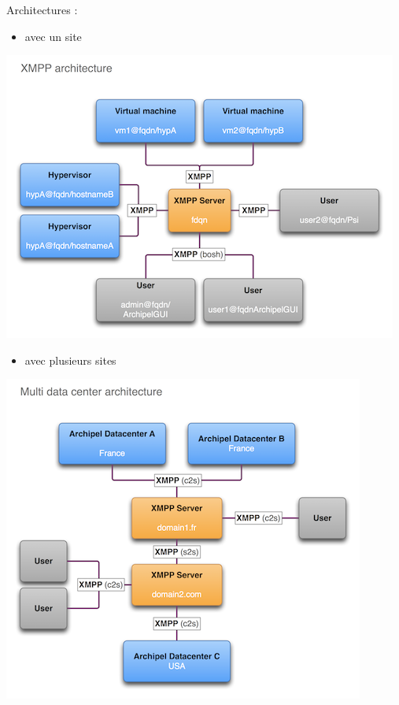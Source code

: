\documentclass{beamer}
\begin{document}
\begin{frame}
 Architectures :\\
\begin{itemize}
 \item avec un site
\end{itemize}
\includegraphics{images_presentation/archipel.png}
\end{frame}

\begin{frame}
\begin{itemize}
 \item avec plusieurs sites
\end{itemize}
\includegraphics{images_presentation/archipel1.png}
\end{frame}
\end{document}

